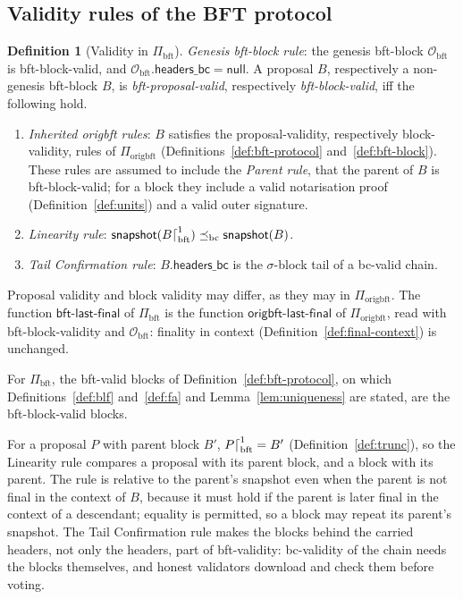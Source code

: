 \documentclass[11pt,a4paper]{article}
\theoremstyle{definition}
\newtheorem{definition}[theorem]{Definition}
\newcommand{\bc}{\mathrm{bc}}
\newcommand{\bft}{\mathrm{bft}}
\newcommand{\Origin}{\mathcal{O}}
\newcommand{\Obft}{\Origin_{\bft}}
\newcommand{\preceqbc}{\preceq_{\bc}}
\newcommand{\Piorigbft}{\Pi_{\mathrm{origbft}}}
\newcommand{\Pibft}{\Pi_{\bft}}
\newcommand{\bftlastfinal}{\mathsf{bft\text{-}last\text{-}final}}
\newcommand{\origbftlastfinal}{\mathsf{origbft\text{-}last\text{-}final}}
\newcommand{\headersbc}{\mathsf{headers\_bc}}
\newcommand{\snapshot}{\mathsf{snapshot}}
\begin{document}
\subsection{Validity rules of the BFT protocol}\label{sec:cons-bft-rules}

\begin{definition}[Validity in $\Pibft$]\label{def:bft-validity}
\emph{Genesis bft-block rule}: the genesis bft-block $\Obft$ is
bft-block-valid, and $\Obft.\headersbc = \mathsf{null}$. A proposal $B$,
respectively a non-genesis bft-block $B$, is \emph{bft-proposal-valid},
respectively \emph{bft-block-valid}, iff the following hold.
\begin{enumerate}[label=(\roman*)]
\item \emph{Inherited origbft rules}: $B$ satisfies the proposal-validity,
  respectively block-validity, rules of $\Piorigbft$
  (Definitions~\ref{def:bft-protocol} and~\ref{def:bft-block}). These rules
  are assumed to include the \emph{Parent rule}, that the parent of $B$ is
  bft-block-valid; for a block they include a valid notarisation proof
  (Definition~\ref{def:units}) and a valid outer signature.
\item \emph{Linearity rule}:
  $\snapshot(B\trunc[\bft]{1}) \preceqbc \snapshot(B)$.
\item \emph{Tail Confirmation rule}: $B.\headersbc$ is the $\sigma$-block
  tail of a bc-valid chain.
\end{enumerate}
Proposal validity and block validity may differ, as they may in
$\Piorigbft$. The function $\bftlastfinal$ of $\Pibft$ is the function
$\origbftlastfinal$ of $\Piorigbft$, read with bft-block-validity and
$\Obft$: finality in context (Definition~\ref{def:final-context}) is
unchanged.
\end{definition}

For $\Pibft$, the bft-valid blocks of Definition~\ref{def:bft-protocol}, on
which Definitions~\ref{def:blf} and~\ref{def:fa} and Lemma~\ref{lem:uniqueness}
are stated, are the bft-block-valid blocks.

For a proposal $P$ with parent block $B'$, $P\trunc[\bft]{1} = B'$
(Definition~\ref{def:trunc}), so the Linearity rule compares a proposal with
its parent block, and a block with its parent. The rule is relative to the
parent's snapshot even when the parent is not final in the context of $B$,
because it must hold if the parent is later final in the context of a
descendant; equality is permitted, so a block may repeat its parent's
snapshot. The Tail Confirmation rule makes the blocks behind the carried
headers, not only the headers, part of bft-validity: bc-validity of the
chain needs the blocks themselves, and honest validators download and check
them before voting.
\end{document}
